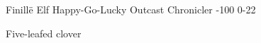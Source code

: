 
\begin{filledCS}%
  {Finill\"e}%
  {Elf}%
  {Happy-Go-Lucky Outcast}%
  {Chronicler}%
  {{-1}{0}{0}}%
  {{0}{-2}{2}}%
  {%
    \setcounter{Empathy}{1}
    \setcounter{Survival}{1}
    \setcounter{Fire}{1}
    \setcounter{Air}{2}
    \Dagger
    \addtocounter{equipmentWeight}{-1}
  }%
  {}%
  {Five-leafed clover}%
  \renewcommand\rank{Fodder}
  \renewcommand\characterDebt{100 \glspl{sp}}

  \renewcommand\charSpells{
    \showSpells{Air2}
    \showSpells{Air1}
    \showSpells{Air1}
    \showSpells{Fire1}
    \showSpells{Light1}
    \showSpells{Light1}
  }

\end{filledCS}

